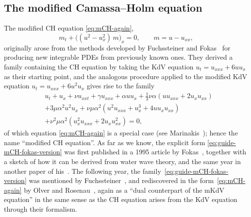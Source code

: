 \documentclass[10pt,a4paper]{article} \pdfoutput=1 
\begin{document}
\subsection{The modified Camassa--Holm equation}
\label{sec:guide-mCH}

The modified CH equation \eqref{eq:mCH-again},
\begin{equation*}
  m_t + \bigl( (u^2-u_x^2) \, m \bigr)_x = 0
  ,\qquad
  m = u-u_{xx}
  ,
\end{equation*}
originally arose from the methods developed by Fuchssteiner and Fokas~\cite{fuchssteiner-fokas:1981:symplectic-structures-backlund-transformations-hereditary-symmetries}
for producing new integrable PDEs from previously known ones.
They derived a family containing the CH equation by taking
the KdV equation $u_t = u_{xxx} + 6 u u_x$ as their starting point,
and the analogous procedure applied to the modified KdV equation $u_t = u_{xxx} + 6 u^2 u_x$
gives rise to the family
\begin{equation}
  \label{eq:guide-mCH-fokas-version}
  \begin{split}
    &
    u_t + u_x + \nu u_{xxt} + \gamma u_{xxx} + \alpha u u_x + \tfrac13 \nu \alpha ( u u_{xxx} + 2 u_x u_{xx} )
    \\ &
    + 3 \mu \alpha^2 u^2 u_x + \nu \mu \alpha^2 ( u^2 u_{xxx} + u_x^3 + 4 u u_x u_{xx} )
    \\ &
    + \nu^2 \mu \alpha^2 (u_x^2 u_{xxx} + 2 u_x u_{xx}^2) = 0
    ,
  \end{split}
\end{equation}
of which equation \eqref{eq:mCH-again} is a special case
(see Marinakis~\cite{marinakis:2009:mCH-comment-on-qiao});
hence the name ``modified CH equation''.
As far as we know, the explicit form \eqref{eq:guide-mCH-fokas-version}
was first published in a 1995 article by Fokas~\cite[eq.~(3.9)]{fokas:1995:KdV-and-beyond},
together with a sketch of how it can be derived from water wave theory,
and the same year in another paper of his~\cite[eq.~(7)]{fokas:1995:a-class-of-physically-important-integrable-equations}.
The following year, the family~\eqref{eq:guide-mCH-fokas-version} was mentioned by Fuchssteiner~\cite[eq.~(3.5)]{fuchssteiner:1996:symmetry-toolbox-tricks-generalizations-of-CH},
and rediscovered in the form~\eqref{eq:mCH-again} by Olver and Rosenau~\cite[eq.~(25)]{olver-rosenau:1996:trihamiltonian-duality-solitons-compact-support},
again as a ``dual counterpart of the mKdV equation'' in the same sense as the CH equation arises
from the KdV equation through their formalism.
\end{document}
